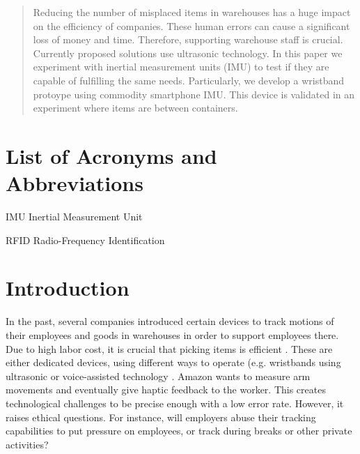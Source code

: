 \documentclass[12pt,twoside, hidelinks]{article}
\begin{document}
\maketitle


\begin{abstract}
\label{sec:abstract}

Reducing the number of misplaced items in warehouses has a huge impact on the efficiency of companies. These human errors can cause a significant loss of money and time. Therefore, supporting warehouse staff is crucial. Currently proposed solutions use ultrasonic technology. In this paper we experiment with inertial measurement units (IMU) to test if they are capable of fulfilling the same needs. Particularly, we develop a wristband protoype using commodity smartphone IMU. This device is validated in an experiment where items are between containers.

\end{abstract}

\tableofcontents

\section*{List of Acronyms and Abbreviations}

\begin{basedescript}{\desclabelstyle{\pushlabel}\desclabelwidth{10em}}
\item[IMU]					Inertial Measurement Unit
\item[RFID]					Radio-Frequency Identification
\end{basedescript}


\clearpage
\section{Introduction}
\label{sect:introduction}
In the past, several companies introduced certain devices to track motions of their employees and goods in warehouses in order to support employees there. Due to high labor cost, it is crucial that picking items is efficient \cite{frazelle2002}. These are either dedicated devices, using different ways to operate (e.g. wristbands using ultrasonic or voice-assisted technology \cite{bergerLudwig2007}. Amazon wants to measure arm movements and eventually give haptic feedback to the worker. This creates technological challenges to be precise enough with a low error rate. However, it raises ethical questions. For instance, will employers abuse their tracking capabilities to put pressure on employees, or track during breaks or other private activities?
\end{document}
